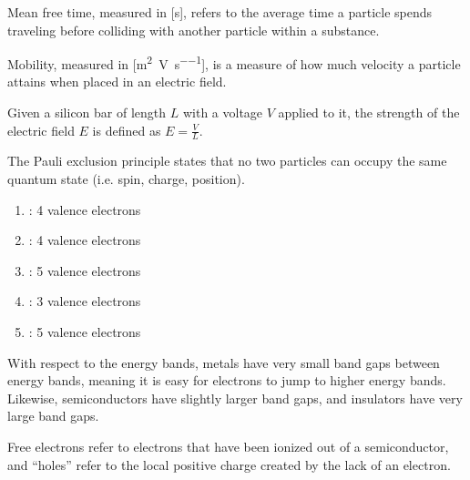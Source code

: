 \documentclass{article}
\begin{document}
\maketitle

\question{}

\begin{subparts}
  \item Mean free time, measured in [\unit{\second}], refers to the average time a particle spends traveling before colliding with another particle within a substance.
  \item Mobility, measured in [\unit{\meter\squared\per\volt\per\second}], is a measure of how much velocity a particle attains when placed in an electric field.
  \item
  \item Given a silicon bar of length \(L\) with a voltage \(V\) applied to it, the strength of the electric field \(E\) is defined as \(E = \frac{V}{L}\).
\end{subparts}

\question{}

\begin{subparts}
  \item The Pauli exclusion principle states that no two particles can occupy the same quantum state (i.e. spin, charge, position).
  \item
  \begin{enumerate}
    \item {}: 4 valence electrons
    \item {}: 4 valence electrons
    \item {}: 5 valence electrons
    \item {}: 3 valence electrons
    \item {}: 5 valence electrons
  \end{enumerate}
  \item With respect to the energy bands, metals have very small band gaps between energy bands, meaning it is easy for electrons to jump to higher energy bands.
  Likewise, semiconductors have slightly larger band gaps, and insulators have very large band gaps.
  \item Free electrons refer to electrons that have been ionized out of a semiconductor, and ``holes'' refer to the local positive charge created by the lack of an electron.
\end{subparts}
\end{document}
